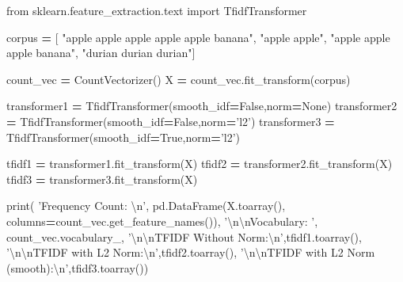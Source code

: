 \documentclass[
]{book}
\newenvironment{Shaded}{\begin{snugshade}}{\end{snugshade}}
\newcommand{\BuiltInTok}[1]{#1}
\newcommand{\CharTok}[1]{\textcolor[rgb]{0.5,0.5,0.5}{#1}}
\newcommand{\ImportTok}[1]{#1}
\newcommand{\NormalTok}[1]{#1}
\newcommand{\OperatorTok}[1]{\textcolor[rgb]{0.43,0.43,0.43}{\textbf{#1}}}
\newcommand{\StringTok}[1]{\textcolor[rgb]{0.5,0.5,0.5}{#1}}
\newcommand{\VariableTok}[1]{\textcolor[rgb]{0,0,0}{#1}}
\begin{document}
\begin{Shaded}
\begin{Highlighting}[]
\ImportTok{from}\NormalTok{ sklearn.feature_extraction.text }\ImportTok{import}\NormalTok{ TfidfTransformer}

\NormalTok{corpus }\OperatorTok{=}\NormalTok{ [}
    \StringTok{"apple apple apple apple apple banana"}\NormalTok{,}
    \StringTok{"apple apple"}\NormalTok{,}
    \StringTok{"apple apple apple banana"}\NormalTok{,}
    \StringTok{"durian durian durian"}\NormalTok{]}
    
\NormalTok{count_vec }\OperatorTok{=}\NormalTok{ CountVectorizer()}
\NormalTok{X }\OperatorTok{=}\NormalTok{ count_vec.fit_transform(corpus)}

\NormalTok{transformer1 }\OperatorTok{=}\NormalTok{ TfidfTransformer(smooth_idf}\OperatorTok{=}\VariableTok{False}\NormalTok{,norm}\OperatorTok{=}\VariableTok{None}\NormalTok{)}
\NormalTok{transformer2 }\OperatorTok{=}\NormalTok{ TfidfTransformer(smooth_idf}\OperatorTok{=}\VariableTok{False}\NormalTok{,norm}\OperatorTok{=}\StringTok{'l2'}\NormalTok{)}
\NormalTok{transformer3 }\OperatorTok{=}\NormalTok{ TfidfTransformer(smooth_idf}\OperatorTok{=}\VariableTok{True}\NormalTok{,norm}\OperatorTok{=}\StringTok{'l2'}\NormalTok{)}

\NormalTok{tfidf1 }\OperatorTok{=}\NormalTok{ transformer1.fit_transform(X)}
\NormalTok{tfidf2 }\OperatorTok{=}\NormalTok{ transformer2.fit_transform(X)}
\NormalTok{tfidf3 }\OperatorTok{=}\NormalTok{ transformer3.fit_transform(X)}

\BuiltInTok{print}\NormalTok{(}
  \StringTok{'Frequency Count: }\CharTok{\textbackslash{}n}\StringTok{'}\NormalTok{, pd.DataFrame(X.toarray(), columns}\OperatorTok{=}\NormalTok{count_vec.get_feature_names()),}
  \StringTok{'}\CharTok{\textbackslash{}n\textbackslash{}n}\StringTok{Vocabulary: '}\NormalTok{, count_vec.vocabulary_,}
  \StringTok{'}\CharTok{\textbackslash{}n\textbackslash{}n}\StringTok{TFIDF Without Norm:}\CharTok{\textbackslash{}n}\StringTok{'}\NormalTok{,tfidf1.toarray(), }
  \StringTok{'}\CharTok{\textbackslash{}n\textbackslash{}n}\StringTok{TFIDF with L2 Norm:}\CharTok{\textbackslash{}n}\StringTok{'}\NormalTok{,tfidf2.toarray(),  }
  \StringTok{'}\CharTok{\textbackslash{}n\textbackslash{}n}\StringTok{TFIDF with L2 Norm (smooth):}\CharTok{\textbackslash{}n}\StringTok{'}\NormalTok{,tfidf3.toarray())}
\end{Highlighting}
\end{Shaded}
\end{document}
